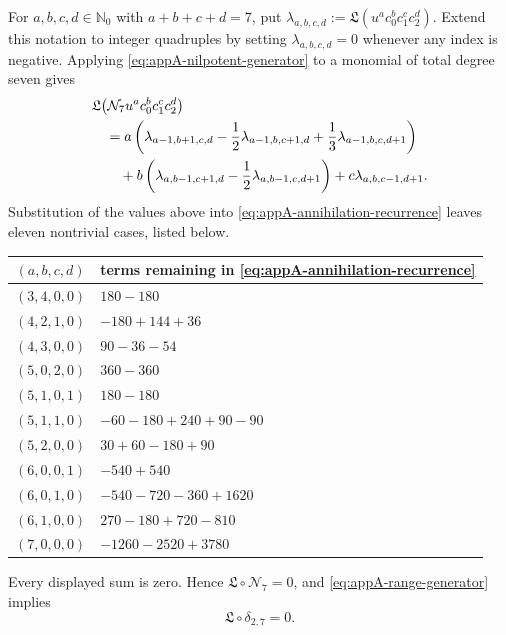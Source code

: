 \documentclass[11pt]{amsart}
\theoremstyle{plain}
\theoremstyle{definition}
\theoremstyle{remark}
\numberwithin{equation}{section}
\theoremstyle{plain}
\begin{document}
For $a,b,c,d\in\mathbb N_0$ with $a+b+c+d=7$, put
$\lambda_{a,b,c,d}:=\mathfrak L(u^ac_0^bc_1^cc_2^d)$.  Extend this notation
to integer quadruples by setting $\lambda_{a,b,c,d}=0$ whenever any index is
negative.  Applying \eqref{eq:appA-nilpotent-generator} to a monomial of
total degree seven gives
\begin{align}
&\mathfrak L\!\left(\mathcal N_7
	u^ac_0^bc_1^cc_2^d\right)\notag\\
&\quad=a\left(
	\lambda_{a-1,b+1,c,d}
	-\frac12\lambda_{a-1,b,c+1,d}
	+\frac13\lambda_{a-1,b,c,d+1}\right)\notag\\
&\qquad+b\left(
	\lambda_{a,b-1,c+1,d}
	-\frac12\lambda_{a,b-1,c,d+1}\right)
	+c\lambda_{a,b,c-1,d+1}.
	\label{eq:appA-annihilation-recurrence}
\end{align}
Substitution of the values above into
\eqref{eq:appA-annihilation-recurrence} leaves eleven nontrivial cases, listed
below.
\begin{center}
	\small
	\begin{tabular}{@{}c l@{}}
		\toprule
		$(a,b,c,d)$ & terms remaining in \eqref{eq:appA-annihilation-recurrence}\\
		\midrule
		$(3,4,0,0)$ & $180-180$\\
		$(4,2,1,0)$ & $-180+144+36$\\
		$(4,3,0,0)$ & $90-36-54$\\
		$(5,0,2,0)$ & $360-360$\\
		$(5,1,0,1)$ & $180-180$\\
		$(5,1,1,0)$ & $-60-180+240+90-90$\\
		$(5,2,0,0)$ & $30+60-180+90$\\
		$(6,0,0,1)$ & $-540+540$\\
		$(6,0,1,0)$ & $-540-720-360+1620$\\
		$(6,1,0,0)$ & $270-180+720-810$\\
		$(7,0,0,0)$ & $-1260-2520+3780$\\
		\bottomrule
	\end{tabular}
\end{center}
Every displayed sum is zero.  Hence
$\mathfrak L\circ\mathcal N_7=0$, and
\eqref{eq:appA-range-generator} implies
\begin{equation}\label{eq:appA-annihilation}
	\mathfrak L\circ\delta_{2,7}=0.
\end{equation}
\end{document}
